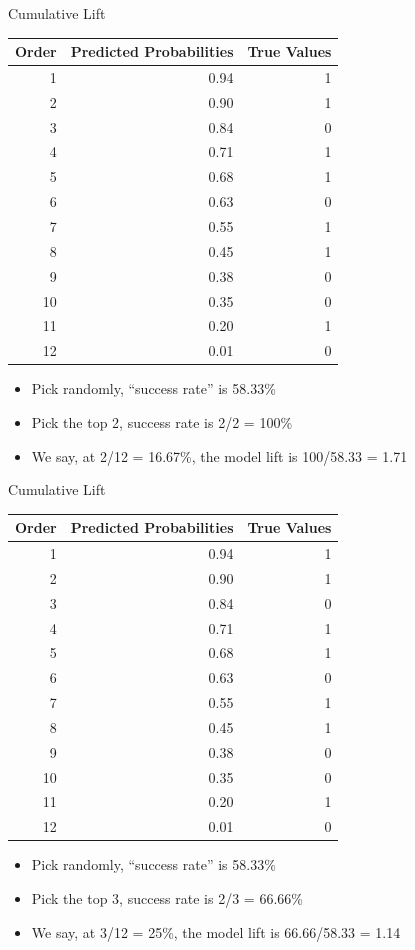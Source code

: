 \documentclass[
  ignorenonframetext,
]{beamer}
\providecommand{\tightlist}{%
  \setlength{\itemsep}{0pt}\setlength{\parskip}{0pt}}
\begin{document}
\begin{frame}{Cumulative Lift}
\protect\hypertarget{cumulative-lift-4}{}

\begin{longtable}[]{@{}rrr@{}}
\toprule
Order & Predicted Probabilities & True Values\tabularnewline
\midrule
\endhead
1 & 0.94 & 1\tabularnewline
2 & 0.90 & 1\tabularnewline
3 & 0.84 & 0\tabularnewline
4 & 0.71 & 1\tabularnewline
5 & 0.68 & 1\tabularnewline
6 & 0.63 & 0\tabularnewline
7 & 0.55 & 1\tabularnewline
8 & 0.45 & 1\tabularnewline
9 & 0.38 & 0\tabularnewline
10 & 0.35 & 0\tabularnewline
11 & 0.20 & 1\tabularnewline
12 & 0.01 & 0\tabularnewline
\bottomrule
\end{longtable}

\begin{itemize}
\tightlist
\item
  Pick randomly, ``success rate'' is 58.33\%
\item
  Pick the top 2, success rate is 2/2 = 100\%
\item
  We say, at 2/12 = 16.67\%, the model lift is 100/58.33 = 1.71
\end{itemize}

\end{frame}

\begin{frame}{Cumulative Lift}
\protect\hypertarget{cumulative-lift-5}{}

\begin{longtable}[]{@{}rrr@{}}
\toprule
Order & Predicted Probabilities & True Values\tabularnewline
\midrule
\endhead
1 & 0.94 & 1\tabularnewline
2 & 0.90 & 1\tabularnewline
3 & 0.84 & 0\tabularnewline
4 & 0.71 & 1\tabularnewline
5 & 0.68 & 1\tabularnewline
6 & 0.63 & 0\tabularnewline
7 & 0.55 & 1\tabularnewline
8 & 0.45 & 1\tabularnewline
9 & 0.38 & 0\tabularnewline
10 & 0.35 & 0\tabularnewline
11 & 0.20 & 1\tabularnewline
12 & 0.01 & 0\tabularnewline
\bottomrule
\end{longtable}

\begin{itemize}
\tightlist
\item
  Pick randomly, ``success rate'' is 58.33\%
\item
  Pick the top 3, success rate is 2/3 = 66.66\%
\item
  We say, at 3/12 = 25\%, the model lift is 66.66/58.33 = 1.14
\end{itemize}

\end{frame}
\end{document}
